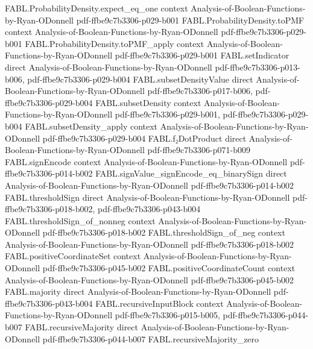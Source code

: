 \begin{theorem}
\proofstep
  {FABL.ProbabilityDensity.expect_eq_one}
  {context}
  {Analysis-of-Boolean-Functions-by-Ryan-ODonnell}
  {pdf-ffbe9c7b3306-p029-b001}
\proofstep
  {FABL.ProbabilityDensity.toPMF}
  {context}
  {Analysis-of-Boolean-Functions-by-Ryan-ODonnell}
  {pdf-ffbe9c7b3306-p029-b001}
\proofstep
  {FABL.ProbabilityDensity.toPMF_apply}
  {context}
  {Analysis-of-Boolean-Functions-by-Ryan-ODonnell}
  {pdf-ffbe9c7b3306-p029-b001}
\proofstep
  {FABL.setIndicator}
  {direct}
  {Analysis-of-Boolean-Functions-by-Ryan-ODonnell}
  {pdf-ffbe9c7b3306-p013-b006,
    pdf-ffbe9c7b3306-p029-b004}
\proofstep
  {FABL.subsetDensityValue}
  {direct}
  {Analysis-of-Boolean-Functions-by-Ryan-ODonnell}
  {pdf-ffbe9c7b3306-p017-b006,
    pdf-ffbe9c7b3306-p029-b004}
\proofstep
  {FABL.subsetDensity}
  {context}
  {Analysis-of-Boolean-Functions-by-Ryan-ODonnell}
  {pdf-ffbe9c7b3306-p029-b001,
    pdf-ffbe9c7b3306-p029-b004}
\proofstep
  {FABL.subsetDensity_apply}
  {context}
  {Analysis-of-Boolean-Functions-by-Ryan-ODonnell}
  {pdf-ffbe9c7b3306-p029-b004}
\proofstep
  {FABL.f₂DotProduct}
  {direct}
  {Analysis-of-Boolean-Functions-by-Ryan-ODonnell}
  {pdf-ffbe9c7b3306-p071-b009}
\proofstep
  {FABL.signEncode}
  {context}
  {Analysis-of-Boolean-Functions-by-Ryan-ODonnell}
  {pdf-ffbe9c7b3306-p014-b002}
\proofstep
  {FABL.signValue_signEncode_eq_binarySign}
  {direct}
  {Analysis-of-Boolean-Functions-by-Ryan-ODonnell}
  {pdf-ffbe9c7b3306-p014-b002}
\proofstep
  {FABL.thresholdSign}
  {direct}
  {Analysis-of-Boolean-Functions-by-Ryan-ODonnell}
  {pdf-ffbe9c7b3306-p018-b002,
    pdf-ffbe9c7b3306-p043-b004}
\proofstep
  {FABL.thresholdSign_of_nonneg}
  {context}
  {Analysis-of-Boolean-Functions-by-Ryan-ODonnell}
  {pdf-ffbe9c7b3306-p018-b002}
\proofstep
  {FABL.thresholdSign_of_neg}
  {context}
  {Analysis-of-Boolean-Functions-by-Ryan-ODonnell}
  {pdf-ffbe9c7b3306-p018-b002}
\proofstep
  {FABL.positiveCoordinateSet}
  {context}
  {Analysis-of-Boolean-Functions-by-Ryan-ODonnell}
  {pdf-ffbe9c7b3306-p045-b002}
\proofstep
  {FABL.positiveCoordinateCount}
  {context}
  {Analysis-of-Boolean-Functions-by-Ryan-ODonnell}
  {pdf-ffbe9c7b3306-p045-b002}
\proofstep
  {FABL.majority}
  {direct}
  {Analysis-of-Boolean-Functions-by-Ryan-ODonnell}
  {pdf-ffbe9c7b3306-p043-b004}
\proofstep
  {FABL.recursiveInputBlock}
  {context}
  {Analysis-of-Boolean-Functions-by-Ryan-ODonnell}
  {pdf-ffbe9c7b3306-p015-b005,
    pdf-ffbe9c7b3306-p044-b007}
\proofstep
  {FABL.recursiveMajority}
  {direct}
  {Analysis-of-Boolean-Functions-by-Ryan-ODonnell}
  {pdf-ffbe9c7b3306-p044-b007}
\proofstep
  {FABL.recursiveMajority_zero}

\end{theorem}
